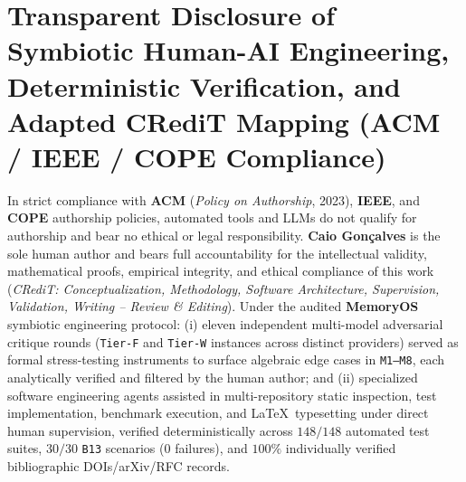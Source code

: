 \documentclass[10pt,twocolumn]{article}
\begin{document}
\section*{Transparent Disclosure of Symbiotic Human-AI Engineering, Deterministic Verification, and Adapted CRediT Mapping (ACM / IEEE / COPE Compliance)}

In strict compliance with \textbf{ACM} (\emph{Policy on Authorship}, 2023), \textbf{IEEE}, and \textbf{COPE} authorship policies, automated tools and LLMs do not qualify for authorship and bear no ethical or legal responsibility. \textbf{Caio Gon\c{c}alves} is the sole human author and bears full accountability for the intellectual validity, mathematical proofs, empirical integrity, and ethical compliance of this work (\emph{CRediT: Conceptualization, Methodology, Software Architecture, Supervision, Validation, Writing -- Review \& Editing}). Under the audited \textbf{MemoryOS} symbiotic engineering protocol: (i) eleven independent multi-model adversarial critique rounds (\texttt{Tier-F} and \texttt{Tier-W} instances across distinct providers) served as formal stress-testing instruments to surface algebraic edge cases in \texttt{M1--M8}, each analytically verified and filtered by the human author; and (ii) specialized software engineering agents assisted in multi-repository static inspection, test implementation, benchmark execution, and \LaTeX\ typesetting under direct human supervision, verified deterministically across $148/148$ automated test suites, $30/30$ \texttt{B13} scenarios ($0$ failures), and $100\%$ individually verified bibliographic DOIs/arXiv/RFC records.



\end{document}
